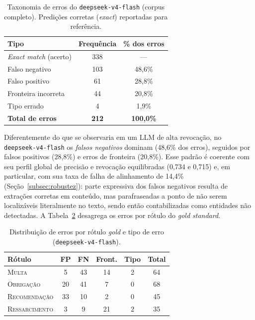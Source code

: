 \begin{table}[ht]
    \centering
    \caption{Taxonomia de erros do \texttt{deepseek-v4-flash} (corpus completo). Predições corretas (\textit{exact}) reportadas para referência.}
    \label{tab:taxonomia_erros}
    \small
    \begin{tabular}{lcc}
        \hline
        \textbf{Tipo} & \textbf{Frequência} & \textbf{\% dos erros} \\
        \hline
        \textit{Exact match} (acerto)        & 338 & --- \\
        \hline
        Falso negativo                       & 103 & 48,6\% \\
        Falso positivo                       &  61 & 28,8\% \\
        Fronteira incorreta                  &  44 & 20,8\% \\
        Tipo errado                          &   4 &  1,9\% \\
        \hline
        \textbf{Total de erros}              & \textbf{212} & \textbf{100,0\%} \\
        \hline
    \end{tabular}
\end{table}

Diferentemente do que se observaria em um LLM de alta revocação, no \texttt{deepseek-v4-flash} os \emph{falsos negativos} dominam (48,6\% dos erros), seguidos por falsos positivos (28,8\%) e erros de fronteira (20,8\%). Esse padrão é coerente com seu perfil global de precisão e revocação equilibradas (0,734 e 0,715) e, em particular, com sua taxa de falha de alinhamento de 14,4\% (Seção~\ref{subsec:robustez}): parte expressiva dos falsos negativos resulta de extrações corretas em conteúdo, mas parafraseadas a ponto de não serem localizáveis literalmente no texto, sendo então contabilizadas como entidades não detectadas. A Tabela~\ref{tab:cross_erros} desagrega os erros por rótulo do \textit{gold standard}.

\begin{table}[ht]
    \centering
    \caption{Distribuição de erros por rótulo \textit{gold} e tipo de erro (\texttt{deepseek-v4-flash}).}
    \label{tab:cross_erros}
    \small
    \begin{tabular}{lccccc}
        \hline
        \textbf{Rótulo} & \textbf{FP} & \textbf{FN} & \textbf{Front.} & \textbf{Tipo} & \textbf{Total} \\
        \hline
        \textsc{Multa}         &  5 & 43 & 14 & 2 &  64 \\
        \textsc{Obrigação}     & 20 & 41 &  7 & 0 &  68 \\
        \textsc{Recomendação}  & 33 & 10 &  2 & 0 &  45 \\
        \textsc{Ressarcimento} &  3 &  9 & 21 & 2 &  35 \\
        \hline
    \end{tabular}
\end{table}

